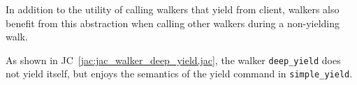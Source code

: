 In addition to the utility of calling walkers that yield from client, walkers also benefit from this abstraction when calling other walkers during a non-yielding walk.
\par
{}
\par
As shown in JC~\ref{jac:jac_walker_deep_yield.jac}, the walker \lstinline{deep_yield} does not yield itself, but enjoys the semantics of the yield command in \lstinline{simple_yield}.
